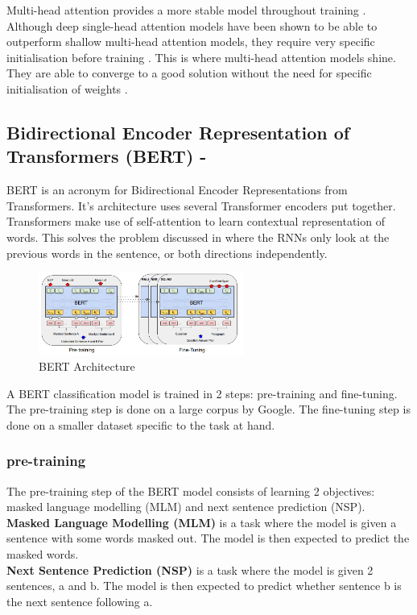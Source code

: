 Multi-head attention provides a more stable model throughout training \cite{multi-head-pros}. Although deep single-head attention models have been shown
to be able to outperform shallow multi-head attention models, they require very specific initialisation before training \cite{multi-head-pros}. This is where
multi-head attention models shine. They are able to converge to a good solution without the need for specific initialisation of weights \cite{multi-head-pros}.
\subsection{Bidirectional Encoder Representation of Transformers (BERT) - \cite{bert}}
BERT is an acronym for Bidirectional Encoder Representations from Transformers. It's architecture uses several Transformer encoders
put together. Transformers make use of self-attention to learn contextual representation of words. This solves the problem
discussed in  where the RNNs only look at the previous words in the sentence, or both directions independently.
\begin{figure}[hbtp]
    \centering
    \includegraphics[width=0.6\textwidth]{../images/bert.png}
    \caption{BERT Architecture}
    \label{fig:bert}
\end{figure}

A BERT classification model is trained in 2 steps: pre-training and fine-tuning. The pre-training step is done on a large corpus
by Google. The fine-tuning step is done on a smaller dataset specific to the task at hand.

\subsubsection{pre-training}
The pre-training step of the BERT model consists of learning 2 objectives: masked language modelling (MLM) and next sentence prediction
(NSP).\\
\textbf{Masked Language Modelling (MLM)} is a task where the model is given a sentence with some words masked out. The model is then
expected to predict the masked words.\\
\textbf{Next Sentence Prediction (NSP)} is a task where the model is given 2 sentences, a and b. The model is then expected to predict
whether sentence b is the next sentence following a.\\\\

